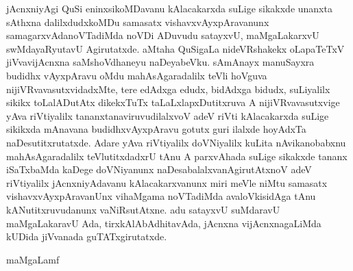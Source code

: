 jAcnxniyAgi QuSi eninxsikoMDavanu kAlacakarxda suLige sikakxde unanxta sAthxna dalilxdudxkoMDu samasatx vishavxvAyxpAravanunx samagarxvAdanoVTadiMda noVDi ADuvudu satayxvU, maMgaLakarxvU swMdayaRyutavU Agirutatxde. aMtaha QuSigaLa nideVRshakekx oLapaTeTxV jiVvavijAcnxna saMshoVdhaneyu naDeyabeVku. sAmAnayx manuSayxra budidhx vAyxpAravu oMdu mahAsAgaradalilx teVli hoVguva nijiVRvavasutxvidadxMte, tere edAdxga edudx, bidAdxga bidudx, suLiyalilx sikikx toLalADutAtx dikekxTuTx taLaLxlapxDutitxruva A nijiVRvavasutxvige yAva riVtiyalilx tananxtanaviruvudilalxvoV adeV riVti kAlacakarxda suLige sikikxda mAnavana budidhxvAyxpAravu gotutx guri ilalxde hoyAdxTa naDesutitxrutatxde. Adare yAva riVtiyalilx doVNiyalilx kuLita nAvikanobabxnu mahAsAgaradalilx teVlutitxdadxrU tAnu A parxvAhada suLige sikakxde tananx iSaTxbaMda kaDege doVNiyanunx naDesabalalxvanAgirutAtxnoV adeV riVtiyalilx jAcnxniyAdavanu kAlacakarxvanunx miri meVle niMtu samasatx vishavxvAyxpAravanUnx vihaMgama noVTadiMda avaloVkisidAga tAnu kANutitxruvudanunx vaNiRsutAtxne. adu satayxvU suMdaravU maMgaLakaravU Ada, tirxkAlAbAdhitavAda, jAcnxna vijAcnxnagaLiMda kUDida jiVvanada guTATxgirutatxde.

\begin{center}
maMgaLamf
\end{center}


